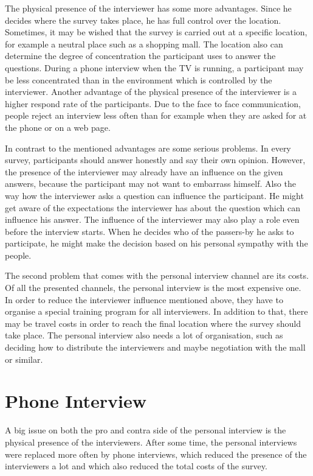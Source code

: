 \documentclass{report}
\begin{document}
The physical presence of the interviewer has some more advantages. Since he decides where the survey takes place, he has full control over the location. Sometimes, it may be wished that the survey is carried out at a specific location, for example a neutral place such as a shopping mall. The location also can determine the degree of concentration the participant uses to answer the questions. During a phone interview when the TV is running, a participant may be less concentrated than in the environment which is controlled by the interviewer. Another advantage of the physical presence of the interviewer is a higher respond rate of the participants. Due to the face to face communication, people reject an interview less often than for example when they are asked for at the phone or on a web page.

In contrast to the mentioned advantages are some serious problems. In every survey, participants should answer honestly and say their own opinion. However, the presence of the interviewer may already have an influence on the given answers, because the participant may not want to embarrass himself. Also the way how the interviewer asks a question can influence the participant. He might get aware of the expectations the interviewer has about the question which can influence his answer. The influence of the interviewer may also play a role even before the interview starts. When he decides who of the passers-by he asks to participate, he might make the decision based on his personal sympathy with the people.

The second problem that comes with the personal interview channel are its costs. Of all the presented channels, the personal interview is the most expensive one. In order to reduce the interviewer influence mentioned above, they have to organise a special training program for all interviewers. In addition to that, there may be travel costs in order to reach the final location where the survey should take place. The personal interview also needs a lot of organisation, such as deciding how to distribute the interviewers and maybe negotiation with the mall or similar.

\section{Phone Interview}

A big issue on both the pro and contra side of the personal interview is the physical presence of the interviewers. After some time, the personal interviews were replaced more often by phone interviews, which reduced the presence of the interviewers a lot and which also reduced the total costs of the survey.
\end{document}
